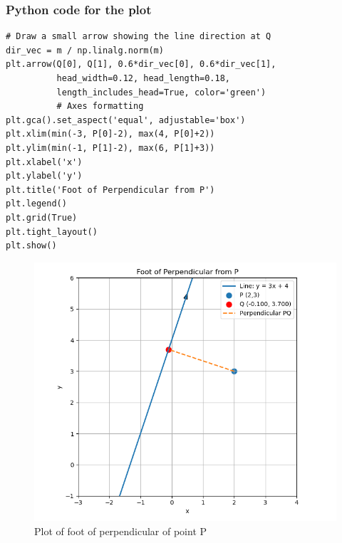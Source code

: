\documentclass{beamer}
\begin{document}
\begin{frame}[fragile]
  \frametitle{Python code for the plot}
    \begin{lstlisting}
# Draw a small arrow showing the line direction at Q
dir_vec = m / np.linalg.norm(m)
plt.arrow(Q[0], Q[1], 0.6*dir_vec[0], 0.6*dir_vec[1],
          head_width=0.12, head_length=0.18,
          length_includes_head=True, color='green')
          # Axes formatting
plt.gca().set_aspect('equal', adjustable='box')
plt.xlim(min(-3, P[0]-2), max(4, P[0]+2))
plt.ylim(min(-1, P[1]-2), max(6, P[1]+3))
plt.xlabel('x')
plt.ylabel('y')
plt.title('Foot of Perpendicular from P')
plt.legend()
plt.grid(True)
plt.tight_layout()
plt.show()
    \end{lstlisting}
\end{frame}
 \begin{figure}
     \centering
     \includegraphics[width=0.7\linewidth]{figs/fig1.png}
     \caption{Plot of foot of perpendicular of point P}
     \label{fig2}
 \end{figure}
\end{document}
